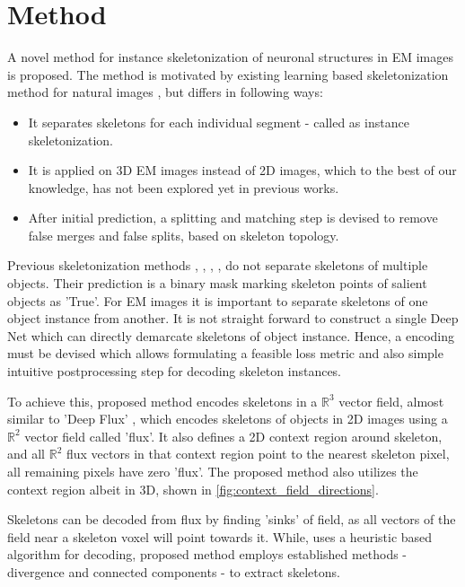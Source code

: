 
\chapter{Method}\label{chapter:method}

A novel method for instance skeletonization of neuronal structures in EM images is proposed. The method is motivated by existing learning based skeletonization method for natural images \cite{Wang2019}, but differs in following ways: 
\begin{itemize}
	\item It separates skeletons for each individual segment - called as instance skeletonization.
	\item It is applied on 3D EM images instead of 2D images, which to the best of our knowledge, has not been explored yet in previous works.
	\item After initial prediction, a splitting and matching step is devised to remove false merges and false splits, based on skeleton topology.
\end{itemize}

Previous skeletonization methods \cite{Shen2016}, \cite{Shen2017}, \cite{Ke2017}, \cite{Wang2019}, \cite{Xu2019} do not separate skeletons of multiple objects. Their prediction is a binary mask marking skeleton points of salient objects as 'True'. For EM images it is important to separate skeletons of one object instance from another. 
It is not straight forward to construct a single Deep Net which can directly demarcate skeletons of object instance. Hence, a encoding must be devised which allows formulating a feasible loss metric and also simple intuitive postprocessing step for decoding skeleton instances. 

To achieve this, proposed method encodes skeletons in a $\mathbb{R}^3$ vector field, almost similar to 'Deep Flux' \cite{Wang2019}, which encodes skeletons of objects in 2D images using a $\mathbb{R}^2$ vector field called 'flux'. It also defines a 2D context region around skeleton, and all $\mathbb{R}^2$ flux vectors in that context region point to the nearest skeleton pixel, all remaining pixels have zero 'flux'. The proposed method also utilizes the context region albeit in 3D, shown in \autoref{fig:context_field_directions}.

Skeletons can be decoded from flux by finding 'sinks' of field, as all vectors of the field near a skeleton voxel will point towards it. While, \cite{Wang2019} uses a heuristic based algorithm for decoding, proposed method employs established methods - divergence and connected components - to extract skeletons.

